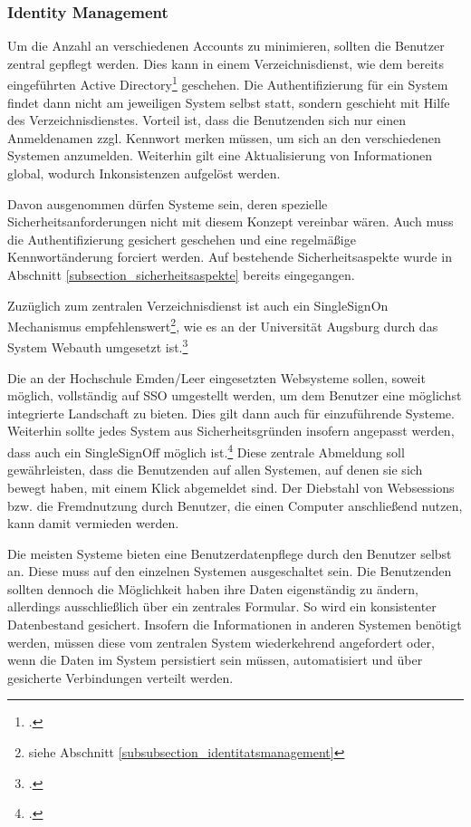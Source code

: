\subsubsection{Identity Management}
Um die Anzahl an verschiedenen Accounts zu minimieren, sollten die Benutzer zentral gepflegt werden. 
Dies kann in einem Verzeichnisdienst, wie dem bereits eingeführten Active Directory\footcite{gunter_muller_interview}
geschehen. Die Authentifizierung für ein System findet dann nicht am jeweiligen System selbst statt, sondern 
geschieht mit Hilfe des Verzeichnisdienstes. Vorteil ist, dass die Benutzenden sich nur einen Anmeldenamen 
zzgl. Kennwort merken müssen, um sich an den verschiedenen Systemen anzumelden. Weiterhin gilt eine 
Aktualisierung von Informationen global, wodurch Inkonsistenzen aufgelöst werden.

Davon ausgenommen dürfen Systeme sein, deren spezielle Sicherheitsanforderungen nicht mit diesem Konzept 
vereinbar wären. Auch muss die Authentifizierung gesichert geschehen und eine regelmäßige Kennwortänderung 
forciert werden. Auf bestehende Sicherheitsaspekte wurde in Abschnitt \ref{subsection_sicherheitsaspekte} bereits 
eingegangen.

Zuzüglich zum zentralen Verzeichnisdienst ist auch ein SingleSignOn Mechanismus 
empfehlenswert\footnote{siehe Abschnitt \ref{subsubsection_identitatsmanagement}}, 
wie es an der Universität Augsburg durch das System Webauth umgesetzt ist.\footcite[Vgl.][206]{digicampus_2009}

Die an der Hochschule Emden/Leer eingesetzten Websysteme sollen, soweit möglich, vollständig auf SSO umgestellt werden, um dem Benutzer eine möglichst integrierte Landschaft zu bieten. Dies gilt dann auch für einzuführende Systeme. Weiterhin sollte jedes System aus Sicherheitsgründen insofern angepasst werden, dass auch ein SingleSignOff möglich ist.\footcite[Vgl.][150]{kloetgen_2012} Diese zentrale Abmeldung soll gewährleisten, dass die Benutzenden auf allen Systemen, auf denen sie sich bewegt haben, mit einem Klick abgemeldet sind. Der Diebstahl von Websessions bzw. die Fremdnutzung durch Benutzer, die einen Computer anschließend nutzen, kann damit vermieden werden.

Die meisten Systeme bieten eine Benutzerdatenpflege durch den Benutzer selbst an. Diese muss auf den einzelnen Systemen ausgeschaltet sein. Die Benutzenden sollten dennoch die Möglichkeit haben ihre Daten eigenständig zu ändern, allerdings ausschließlich über ein zentrales Formular. So wird ein konsistenter Datenbestand gesichert. Insofern die Informationen in anderen Systemen benötigt werden, müssen diese vom zentralen System wiederkehrend angefordert oder, wenn die Daten im System persistiert sein müssen, automatisiert und über gesicherte Verbindungen verteilt werden.

